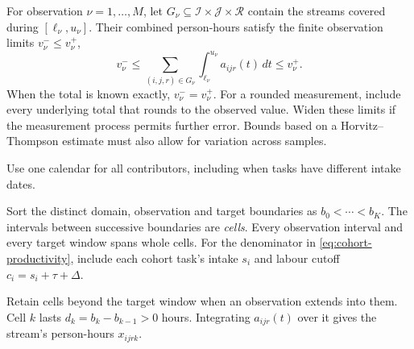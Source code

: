 For observation $\nu=1,\ldots,M$, let $G_\nu\subseteq\mathcal I\times\mathcal J\times\mathcal R$ contain the streams covered during $[\ell_\nu,u_\nu]$. Their combined person-hours satisfy the finite observation limits $v_\nu^-\leq v_\nu^+$,
\begin{equation}
\label{eq:interval-information}
 v_\nu^-\leq
 \sum_{(i,j,r)\in G_\nu}\int_{\ell_\nu}^{u_\nu}a_{ijr}(t)\,dt
 \leq v_\nu^+.
\end{equation}
When the total is known exactly, $v_\nu^-=v_\nu^+$. For a rounded measurement, include every underlying total that rounds to the observed value. Widen these limits if the measurement process permits further error. Bounds based on a Horvitz--Thompson estimate must also allow for variation across samples.

Use one calendar for all contributors, including when tasks have different intake dates.

Sort the distinct domain, observation and target boundaries as $b_0<\cdots<b_K$. The intervals between successive boundaries are \emph{cells}. Every observation interval and every target window spans whole cells. For the denominator in \eqref{eq:cohort-productivity}, include each cohort task's intake $s_i$ and labour cutoff $c_i=s_i+\tau+\Delta$.

Retain cells beyond the target window when an observation extends into them. Cell $k$ lasts $d_k=b_k-b_{k-1}>0$ hours. Integrating $a_{ijr}(t)$ over it gives the stream's person-hours $x_{ijrk}$.

